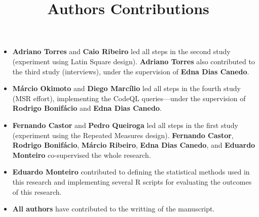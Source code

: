 \documentclass{article}
\title{Authors Contributions}
\begin{document}
\maketitle

\begin{itemize}

\item {\bf Adriano Torres} and {\bf Caio Ribeiro} led all steps in the second study (experiment using Latin Square design). {\bf Adriano Torres} also contributed to the third study (interviews),
  under the supervision of {\bf Edna Dias Canedo}. 

\item {\bf M\'{a}rcio Okimoto} and {\bf Diego Marc\'{i}lio} led all steps in the fourth study (MSR effort), implementing the CodeQL queries---under the
  supervision of {\bf Rodrigo Bonif\'{a}cio} and {\bf Edna Dias Canedo}.


\item {\bf Fernando Castor} and {\bf Pedro Queiroga} led all steps in the first study (experiment using the Repeated Measures design). {\bf Fernando Castor}, {\bf Rodrigo Bonif\'{a}cio}, {\bf M\'{a}rcio Ribeiro}, {\bf Edna Dias Canedo}, and {\bf Eduardo Monteiro} co-supervised the whole research.
  
\item {\bf Eduardo Monteiro} contributed to defining the statistical methods used in this research and implementing several R scripts for evaluating the outcomes of this research.

\item {\bf All authors} have contributed to the writting of the manuscript.    
\end{itemize}
\end{document}
